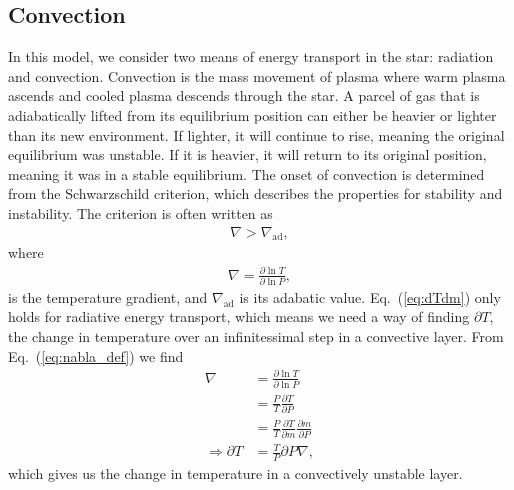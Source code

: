 \documentclass[a4paper, 11pt, english]{article}
\newcommand{\refeq}[1]{(\textcolor{red}{\ref{eq:#1}})} %
\begin{document}
\subsection{Convection}
In this model, we consider two means of energy transport in the star: radiation and
convection. Convection is the mass movement of plasma where warm plasma ascends 
and cooled plasma descends through the star.  A parcel of gas that is adiabatically
lifted from its
equilibrium position can either be heavier or lighter than its new environment. If
lighter, it will continue to rise, meaning the original equilibrium was unstable. If it is
heavier, it will return to its original position, meaning it was in a stable equilibrium.
The onset of convection is determined from
the Schwarzschild criterion, which describes the properties for stability and instability.
The criterion is often written as
\begin{align*}
	\nabla > \nabla_{\mathrm{ad}},
\end{align*}
where 
\begin{align}
	\nabla = \frac{\partial \ln T}{\partial \ln P},
	\label{eq:nabla_def}
\end{align}
is the temperature gradient, and $\nabla_{\mathrm{ad}}$ is its adabatic value. 
Eq.~\refeq{dTdm} only holds for radiative energy transport, which means we
need a way of finding $\partial T$, the change in temperature over an infinitessimal step
in a convective layer.
From Eq.~\refeq{nabla_def} we find
\begin{align}
	\nabla &= \frac{\partial \ln T}{\partial \ln P} \nonumber \\
	&= \frac{P}{T}\frac{\partial T}{\partial P} \nonumber \\
	&= \frac{P}{T}\frac{\partial T}{\partial m} \frac{\partial m}{\partial P} \nonumber \\
	\Rightarrow \partial T &= \frac{T}{P} \partial P \nabla, \label{eq:dt_conv}
\end{align}
which gives us the change in temperature in a convectively unstable layer.
\end{document}
